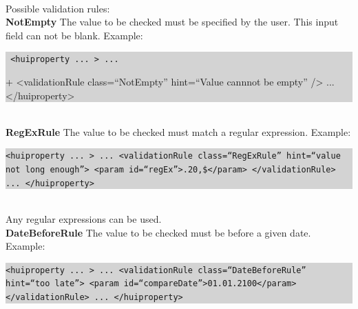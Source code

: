 \documentclass[a4paper,10pt]{book}
\begin{document}
\newline\\
Possible validation rules:
\newline\\
\textbf{NotEmpty}
\newline
The value to be checked must be specified by the user. This input field can not be blank.
\newline
Example:
\newline\\
\colorbox{lightgray}{\parbox{\textwidth}{
{\tt
<huiproperty ... > \newline
   ... \newline

+  <validationRule class=``NotEmpty'' hint=``Value cannnot be empty'' />\newline
   ...\newline
</huiproperty>}
}}
\newline\\
\textbf{RegExRule}
\newline
The value to be checked must match a regular expression.
\newline
Example:
\newline\\
\colorbox{lightgray}{\parbox{\textwidth}{
{\tt <huiproperty ... >\newline
   ...\newline
   <validationRule class=``RegExRule'' hint=``value not long enough''>\newline
      <param id=``regEx''>.{20,}\$</param>\newline
   </validationRule>\newline
   ...\newline
</huiproperty>}
}}
\newline\\
Any regular expressions can be used.
\newline\\
\textbf{DateBeforeRule}
\newline
The value to be checked must be before a given date.
\newline
Example:
\newline\\
\colorbox{lightgray}{\parbox{\textwidth}{
{\tt <huiproperty ... >\newline
   ...\newline
   <validationRule class=``DateBeforeRule'' hint=``too late''>\newline
      <param id=``compareDate''>01.01.2100</param>\newline
   </validationRule>\newline
   ...\newline
</huiproperty>}
}}
\end{document}
